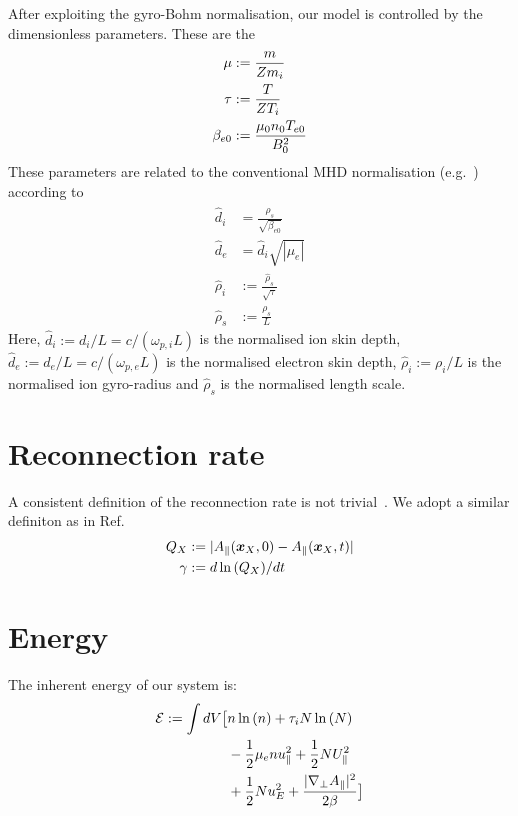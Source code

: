 After exploiting the gyro-Bohm normalisation, our model is controlled by the dimensionless parameters. These
are the
\begin{align}
 \mu   &:=  \frac{m}{Z m_i} \\ 
 \tau  &:=  \frac{T}{ Z T_i}\\
 \beta_{e0} &:=  \frac{\mu_0 n_0 T_{e0} }{ B_0^2 }
\end{align}
These parameters are related to the conventional MHD normalisation (e.g.~\cite{comisso13,zacharias14}) according to
\begin{align}
 \hat{d}_i &= \frac{\hat{\rho}_{s}}{\sqrt{\beta_{e0}}} \\
 \hat{d}_e &= \hat{d}_i \sqrt{|\mu_e|} \\
 \hat{\rho}_{i} &:= \frac{ \hat{\rho}_{s}}{\sqrt{\tau}}\\
 \hat{\rho}_{s} &:= \frac{\rho_{s}}{L}
\end{align}
Here, \(\hat{d}_i:=d_i/L=c/(\omega_{p,i} L)\) is the normalised ion skin depth, \(\hat{d}_e:=d_e/L=c/(\omega_{p,e} L)\) is the normalised electron skin depth, 
\(\hat{\rho}_{i}:=\rho_i/L\) is the normalised ion gyro-radius and \(\hat{\rho}_{s}\) is the normalised length scale.
\\

\section{Reconnection rate}
 A consistent definition of the reconnection rate is not trivial~\cite{comisso16}. 
 We adopt a similar definiton as in Ref.~\cite{comisso13}
\begin{align}
 Q_X&:=|  A_\parallel({\boldsymbol{x}}_X, 0)-A_\parallel({\boldsymbol{x}}_X,t) | \\
 \gamma&:= d \ln{(Q_X)}/dt
\end{align}
\section{Energy}
The inherent energy of our system is:
\begin{align}
 \mathcal{E} := \int dV \big[&
                    n  \ln{(\ensuremath{n })}
                  + \tau_i N \ln{( \ensuremath{N})}
                  \nonumber \\
                 &- \frac{1}{2} \mu_e n  u_\parallel^2
                  + \frac{1}{2} N U_\parallel^2
                  \nonumber \\
                 &+\frac{1}{2} N u_E^2
                  + \frac{|\nabla_\perp A_\parallel|^2}{2 \beta}
                  \big]
\end{align}


